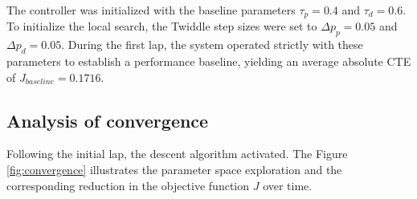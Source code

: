 \documentclass[12pt]{article}
\begin{document}
The controller was initialized with the baseline parameters $\tau_p = 0.4$ and $\tau_d = 0.6$. To
initialize the local search, the Twiddle step sizes were set to $\Delta p_p = 0.05$ and $\Delta p_d = 0.05$.
During the first lap, the system operated strictly with these parameters to establish a performance
baseline, yielding an average absolute CTE of $J_{baseline} = 0.1716$.

\subsection{Analysis of convergence}

Following the initial lap, the descent algorithm activated. The Figure \ref{fig:convergence} illustrates
the parameter space exploration and the corresponding reduction in the objective function $J$ over time.
\end{document}
